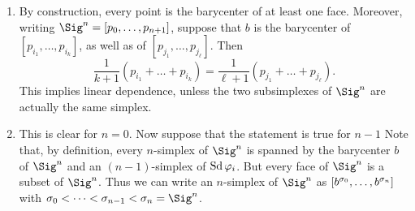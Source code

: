 \documentclass[../../solutions.tex]{subfiles}
\begin{document}
\begin{exercise} \leavevmode
\begin{enumerate}
\item
By construction, every point is the barycenter of at least one face.
Moreover, writing $\Sig^n=[p_0,\dots,p_{n+1}]$, suppose that $b$ is the barycenter of $[p_{i_1},\dots,p_{i_k}]$, as well as of $[p_{j_1},\dots,p_{j_\ell}]$.
Then
\[\frac{1}{k+1}(p_{i_1}+\dots+p_{i_k})=\frac{1}{\ell+1}(p_{j_1}+\dots+p_{j_\ell}).\]
This implies linear dependence, unless the two subsimplexes of $\Sig^n$ are actually the same simplex.
\item
This is clear for $n=0$.
Now suppose that the statement is true for $n-1$
Note that, by definition, every $n$-simplex of $\Sig^n$ is spanned by the barycenter $b$ of $\Sig^n$ and an $(n-1)$-simplex of $\operatorname{Sd}\varphi_i$.
But every face of $\Sig^n$ is a subset of $\Sig^n$.
Thus we can write an $n$-simplex of $\Sig^n$ as $[b^{\sigma_0},\dots,b^{\sigma_n}]$ with $\sig_0<\dots<\sig_{n-1}<\sig_n=\Sig^n$.
\end{enumerate}
\end{exercise}
\end{document}
